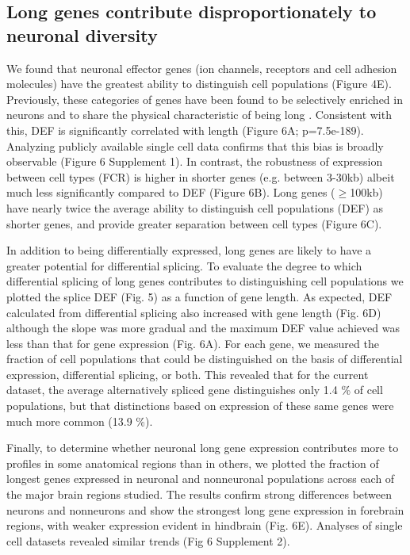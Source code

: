 \subsection{Long genes contribute disproportionately to neuronal diversity}

We found that neuronal effector genes (ion channels, receptors and cell adhesion molecules) have the greatest ability to distinguish cell populations (Figure 4E). Previously, these categories of genes have been found to be selectively enriched in neurons and to share the physical characteristic of being long \citep{Sugino_2014,Gabel_2015,Zylka_2015}. Consistent with this, DEF is significantly correlated with length (Figure 6A; p=7.5e-189). Analyzing publicly available single cell data confirms that this bias is broadly observable (Figure 6 Supplement 1). In contrast, the robustness of expression between cell types (FCR) is higher in shorter genes (e.g. between 3-30kb) albeit much less significantly compared to DEF (Figure 6B). Long genes ($\geq$100kb) have nearly twice the average ability to distinguish cell populations (DEF) as shorter genes, and provide greater separation between cell types (Figure 6C).  

In addition to being differentially expressed, long genes are likely to have a greater potential for differential splicing. To evaluate the degree to which differential splicing of long genes contributes to distinguishing cell populations we plotted the splice DEF (Fig. 5) as a function of gene length. %
As expected, DEF calculated from differential splicing also increased with gene length (Fig. 6D) although the slope was more gradual and the maximum DEF value achieved was less than that for gene expression (Fig. 6A). For each gene, we measured the fraction of cell populations that could be distinguished on the basis of differential expression, differential splicing, or both. This revealed that for the current dataset, the average alternatively spliced gene distinguishes only 1.4 \% of cell populations, but that distinctions based on expression of these same genes were much more common (13.9 \%).  

Finally, to determine whether neuronal long gene expression contributes more to profiles in some anatomical regions than in others, we plotted the fraction of longest genes expressed in neuronal and nonneuronal populations across each of the major brain regions studied. The results confirm strong differences between neurons and nonneurons and show the strongest long gene expression in forebrain regions, with weaker expression evident in hindbrain (Fig. 6E). Analyses of single cell datasets revealed similar trends (Fig 6 Supplement 2).

